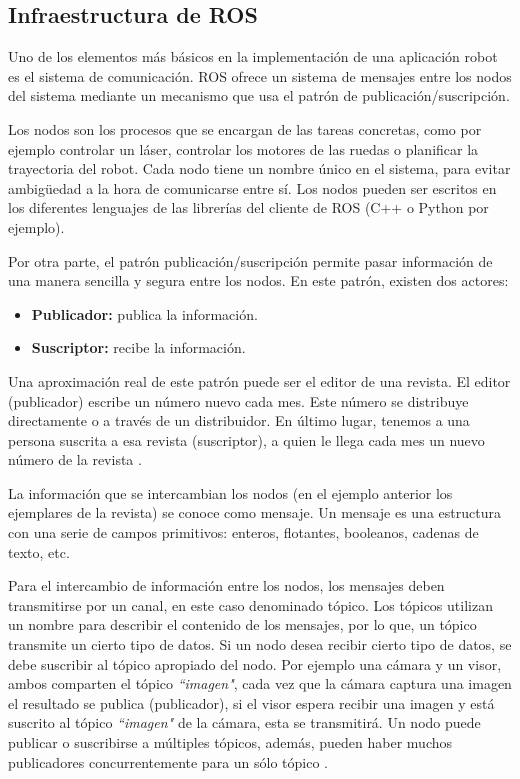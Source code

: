 

\subsection{Infraestructura de ROS}
Uno de los elementos más básicos en la implementación de una aplicación robot es
el sistema de comunicación. ROS ofrece un sistema de mensajes entre los nodos
del sistema mediante un mecanismo que usa el patrón de publicación/suscripción.

Los nodos son los procesos que se encargan de las tareas concretas, como por
ejemplo controlar un láser, controlar los motores de las ruedas o planificar la
trayectoria del robot. Cada nodo tiene un nombre único en el sistema, para
evitar ambigüedad a la hora de comunicarse entre sí. Los nodos pueden ser
escritos en los diferentes lenguajes de las librerías del cliente de ROS (C++ o
Python por ejemplo).

Por otra parte, el patrón publicación/suscripción permite pasar información de
una manera sencilla y segura entre los nodos. En este patrón, existen dos
actores:

\begin{itemize}
  \item \textbf{Publicador:} publica la información.
  \item \textbf{Suscriptor:} recibe la información.
\end{itemize}

Una aproximación real de este patrón puede ser el editor de una revista. El
editor (publicador) escribe un número nuevo cada mes. Este número se distribuye
directamente o a través de un distribuidor. En último lugar, tenemos a una
persona suscrita a esa revista (suscriptor), a quien le llega cada mes un nuevo
número de la revista \cite{PublisherSuscriber}.

La información que se intercambian los nodos (en el ejemplo anterior los
ejemplares de la revista) se conoce como mensaje. Un mensaje es una estructura
con una serie de campos primitivos: enteros, flotantes, booleanos, cadenas de
texto, etc.

Para el intercambio de información entre los nodos, los mensajes deben
transmitirse por un canal, en este caso denominado tópico. Los tópicos utilizan
un nombre para describir el contenido de los mensajes, por lo que, un tópico
transmite un cierto tipo de datos. Si un nodo desea recibir cierto tipo de
datos, se debe suscribir al tópico apropiado del nodo. Por ejemplo una cámara y
un visor, ambos comparten el tópico \textit{``imagen"}, cada vez que la cámara
captura una imagen el resultado se publica (publicador), si el visor espera
recibir una imagen y está suscrito al tópico \textit{``imagen"} de la cámara,
esta se transmitirá. Un nodo puede publicar o suscribirse a múltiples tópicos,
además, pueden haber muchos publicadores concurrentemente para un sólo tópico
\cite{ROSConceptos}.

